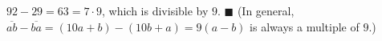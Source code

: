 $92-29=63=7\cdot9$, which is divisible by $9$. $\blacksquare$ (In general, $\overline{ab}-\overline{ba}=(10a+b)-(10b+a)=9(a-b)$ is always a multiple of $9$.)
